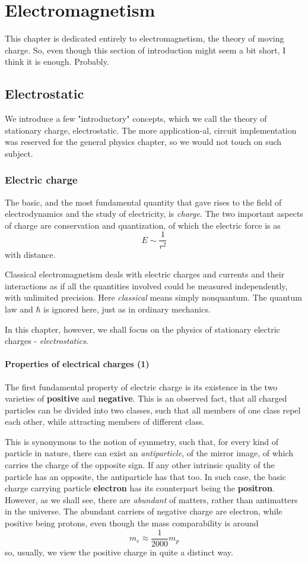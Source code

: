 \chapter{Electromagnetism}

This chapter is dedicated entirely to electromagnetism, the theory of moving charge. So, even though this section of introduction might seem a bit short, I think it is enough. Probably. 
\section{Electrostatic}
We introduce a few "introductory" concepts, which we call the theory of stationary charge, electrostatic. The more application-al, circuit implementation was reserved for the general physics chapter, so we would not touch on such subject. 
\subsection{Electric charge}
The basic, and the most fundamental quantity that gave rises to the field of electrodynamics and the study of electricity, is \textit{charge}. The two important aspects of charge are conservation and quantization, of which the electric force is as $$E\sim \frac{1}{r^{2}}$$
with distance. 

Classical electromagnetism deals with electric charges and currents and their interactions as if all the quantities involved could be measured independently, with unlimited precision. Here \textit{classical} means simply nonquantum. The quantum law and $\hbar$ is ignored here, just as in ordinary mechanics. 

In this chapter, however, we shall focus on the physics of stationary electric charges - \textit{electrostatics}. 
\subsubsection{Properties of electrical charges (1)}
The first fundamental property of electric charge is its existence in the two varieties of \textbf{positive} and \textbf{negative}. This is an observed fact, that all charged particles can be divided into two classes, such that all members of one class repel each other, while attracting members of different class. 

This is synonymous to the notion of symmetry, such that, for every kind of particle in nature, there can exist an \textit{antiparticle}, of the mirror image, of which carries the charge of the opposite sign. If any other intrinsic quality of the particle has an opposite, the antiparticle has that too. In such case, the basic charge carrying particle \textbf{electron} has its counterpart being the \textbf{positron}. However, as we shall see, there are \textit{abundant} of matters, rather than antimatters in the universe. The abundant carriers of negative charge are electron, while positive being protons, even though the mass comparability is around 
$$m_{e}\approx \frac{1}{2000}m_{p}$$
so, usually, we view the positive charge in quite a distinct way. 
